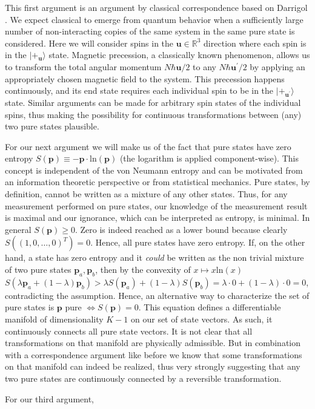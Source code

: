 \documentclass[11pt, a4paper]{article}
\newcommand{\R}{\mathbb{R}}
\begin{document}
\vspace{8pt}
This first argument is an argument by classical correspondence based on Darrigol \cite{DARRIGOL}. We expect classical to emerge from quantum behavior when a sufficiently large number of non-interacting copies of the same system in the same pure state is considered. Here we will consider spins in the $\mathbf u\in\R^3$ direction where each spin is in the $|+_{\mathbf u}\rangle$ state. Magnetic precession, a classically known phenomenon, allows us to transform the total angular momentum $N\hbar\mathbf u/2$ to any $N\hbar\mathbf u^\prime/2$ by applying an appropriately chosen magnetic field to the system. This precession happens continuously, and its end state requires each individual spin to be in the $|+_{\mathbf u^\prime}\rangle$ state. Similar arguments can be made for arbitrary spin states of the individual spins, thus making the possibility for continuous transformations between (any) two pure states plausible.\par
For our next argument we will make us of the fact that pure states have zero entropy $S(\mathbf p)\equiv-\mathbf p\cdot\mathrm{ln}\left(\mathbf p\right)$ (the logarithm is applied component-wise). This concept is independent of the von Neumann entropy and can be motivated from an information theoretic perspective or from statistical mechanics. Pure states, by definition, cannot be written as a mixture of any other states. Thus, for any measurement performed on pure states, our knowledge of the measurement result is maximal and our ignorance, which can be interpreted as entropy, is minimal. In general $S(\mathbf p)\geq 0$. Zero is indeed reached as a lower bound because clearly $S((1,0,\ldots,0)^T)=0$. Hence, all pure states have zero entropy. If, on the other hand, a state has zero entropy and it \emph{could} be written as the non trivial mixture of two pure states $\mathbf p_a,\mathbf p_b$, then by the convexity of $x\mapsto x\mathrm{ln}\left(x\right)$ $S(\lambda \mathbf p_a + (1-\lambda)\mathbf p_b)>\lambda S(\mathbf p_a)+(1-\lambda)S(\mathbf p_b)=\lambda\cdot 0 + (1-\lambda)\cdot 0=0$, contradicting the assumption. Hence, an alternative way to characterize the set of pure states is $\mathbf p$ pure $\iff S(\mathbf p)=0$. This equation defines a differentiable manifold of dimensionality $K-1$ on our set of state vectors. As such, it continuously connects all pure state vectors. It is not clear that all transformations on that manifold are physically admissible. But in combination with a correspondence argument like before we know that some transformations on that manifold can indeed be realized, thus very strongly suggesting that any two pure states are continuously connected by a reversible transformation.\par
For our third argument, 



\printbibliography
\end{document}
